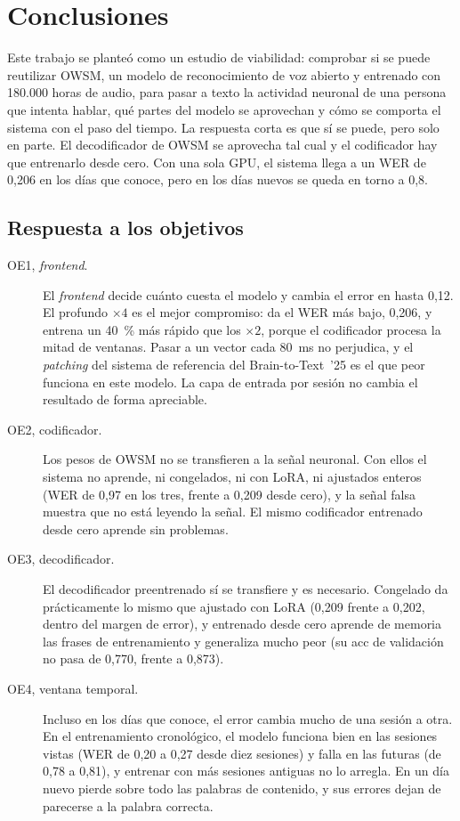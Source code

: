 
\chapter{Conclusiones}
\label{cap:conclusiones}

Este trabajo se planteó como un estudio de viabilidad: comprobar si se puede reutilizar OWSM, un modelo de reconocimiento de voz abierto y entrenado con 180.000 horas de audio, para pasar a texto la actividad neuronal de una persona que intenta hablar, qué partes del modelo se aprovechan y cómo se comporta el sistema con el paso del tiempo. La respuesta corta es que sí se puede, pero solo en parte. El decodificador de OWSM se aprovecha tal cual y el codificador hay que entrenarlo desde cero. Con una sola GPU, el sistema llega a un WER de 0,206 en los días que conoce, pero en los días nuevos se queda en torno a 0,8.

\section{Respuesta a los objetivos}

\begin{description}
  \item[OE1, \textit{frontend}.] El \textit{frontend} decide cuánto cuesta el modelo y cambia el error en hasta 0,12. El profundo $\times 4$ es el mejor compromiso: da el WER más bajo, 0,206, y entrena un 40~\% más rápido que los $\times 2$, porque el codificador procesa la mitad de ventanas. Pasar a un vector cada 80~ms no perjudica, y el \textit{patching} del sistema de referencia del Brain-to-Text~'25 es el que peor funciona en este modelo. La capa de entrada por sesión no cambia el resultado de forma apreciable.
  \item[OE2, codificador.] Los pesos de OWSM no se transfieren a la señal neuronal. Con ellos el sistema no aprende, ni congelados, ni con LoRA, ni ajustados enteros (WER de 0,97 en los tres, frente a 0,209 desde cero), y la señal falsa muestra que no está leyendo la señal. El mismo codificador entrenado desde cero aprende sin problemas.
  \item[OE3, decodificador.] El decodificador preentrenado sí se transfiere y es necesario. Congelado da prácticamente lo mismo que ajustado con LoRA (0,209 frente a 0,202, dentro del margen de error), y entrenado desde cero aprende de memoria las frases de entrenamiento y generaliza mucho peor (su acc de validación no pasa de 0,770, frente a 0,873).
  \item[OE4, ventana temporal.] Incluso en los días que conoce, el error cambia mucho de una sesión a otra. En el entrenamiento cronológico, el modelo funciona bien en las sesiones vistas (WER de 0,20 a 0,27 desde diez sesiones) y falla en las futuras (de 0,78 a 0,81), y entrenar con más sesiones antiguas no lo arregla. En un día nuevo pierde sobre todo las palabras de contenido, y sus errores dejan de parecerse a la palabra correcta.
\end{description}

